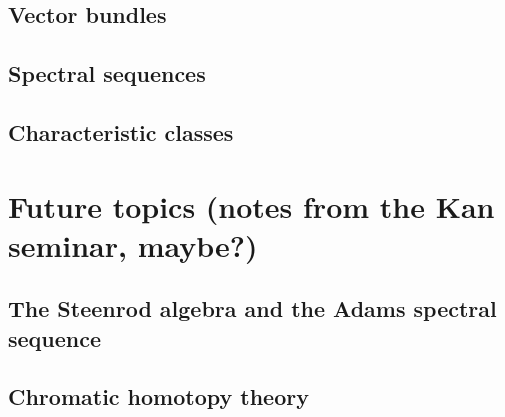 \documentclass[a4paper]{extbook}
\begin{document}
\chapter{Vector bundles}









\chapter{Spectral sequences}











\chapter{Characteristic classes}






\part{Future topics (notes from the Kan seminar, maybe?)}

\chapter{The Steenrod algebra and the Adams spectral sequence}

\chapter{Chromatic homotopy theory}

\newpage
{}
\end{document}

